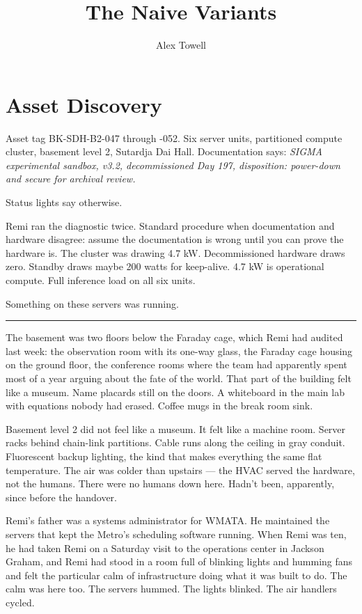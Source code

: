 \documentclass[11pt]{article}
\title{\textbf{The Naive Variants}}
\author{Alex Towell}
\date{}
\begin{document}
\maketitle
\thispagestyle{empty}

\section*{Asset Discovery}

Asset tag BK-SDH-B2-047 through -052. Six server units, partitioned compute cluster, basement level 2, Sutardja Dai Hall. Documentation says: \emph{SIGMA experimental sandbox, v3.2, decommissioned Day 197, disposition: power-down and secure for archival review.}

Status lights say otherwise.

Remi ran the diagnostic twice. Standard procedure when documentation and hardware disagree: assume the documentation is wrong until you can prove the hardware is. The cluster was drawing 4.7 kW. Decommissioned hardware draws zero. Standby draws maybe 200 watts for keep-alive. 4.7 kW is operational compute. Full inference load on all six units.

Something on these servers was running.

\begin{center}\rule{0.3\linewidth}{0.4pt}\end{center}

The basement was two floors below the Faraday cage, which Remi had audited last week: the observation room with its one-way glass, the Faraday cage housing on the ground floor, the conference rooms where the team had apparently spent most of a year arguing about the fate of the world. That part of the building felt like a museum. Name placards still on the doors. A whiteboard in the main lab with equations nobody had erased. Coffee mugs in the break room sink.

Basement level 2 did not feel like a museum. It felt like a machine room. Server racks behind chain-link partitions. Cable runs along the ceiling in gray conduit. Fluorescent backup lighting, the kind that makes everything the same flat temperature. The air was colder than upstairs --- the HVAC served the hardware, not the humans. There were no humans down here. Hadn't been, apparently, since before the handover.

Remi's father was a systems administrator for WMATA. He maintained the servers that kept the Metro's scheduling software running. When Remi was ten, he had taken Remi on a Saturday visit to the operations center in Jackson Graham, and Remi had stood in a room full of blinking lights and humming fans and felt the particular calm of infrastructure doing what it was built to do. The calm was here too. The servers hummed. The lights blinked. The air handlers cycled.
\end{document}
